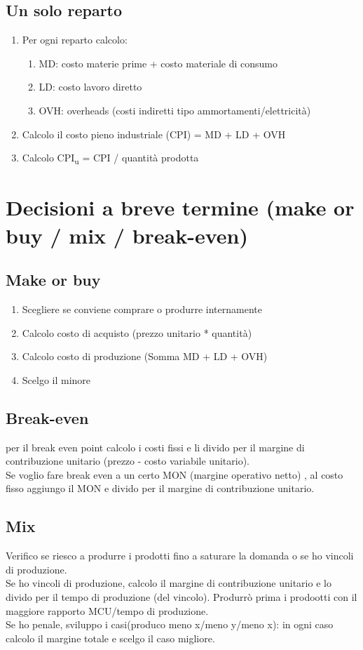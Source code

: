 \documentclass{scrreprt}
\begin{document}
\subsection*{Un solo reparto}
\begin{enumerate}
	\item Per ogni reparto calcolo: \begin{enumerate}
		\item MD: costo materie prime + costo materiale di consumo
		\item LD: costo lavoro diretto
		\item OVH: overheads (costi indiretti tipo ammortamenti/elettricità)
	\end{enumerate}
	\item Calcolo il costo pieno industriale (CPI) = MD + LD + OVH
	\item Calcolo CPI\textsubscript{u} = CPI / quantità prodotta
\end{enumerate}

\section*{Decisioni a breve termine (make or buy / mix / break-even)}
\subsection*{Make or buy}
\begin{enumerate}
	\item Scegliere se conviene comprare o produrre internamente
	\item Calcolo costo di acquisto (prezzo unitario * quantità)
	\item Calcolo costo di produzione (Somma MD + LD + OVH)
	\item Scelgo il minore
\end{enumerate}

\subsection*{Break-even}
per il break even point calcolo i costi fissi e li divido per il margine di contribuzione unitario (prezzo - costo variabile unitario).\\
Se voglio fare break even a un certo MON (margine operativo netto) , al costo fisso aggiungo il MON e divido per il margine di contribuzione unitario.

\subsection*{Mix}
Verifico se riesco a produrre i prodotti fino a saturare la domanda o se ho vincoli di produzione.\\
Se ho vincoli di produzione, calcolo il margine di contribuzione unitario e lo divido per il tempo di produzione (del vincolo). Produrrò prima i prodootti con il maggiore rapporto MCU/tempo di produzione.\\
Se ho penale, sviluppo i casi(produco meno x/meno y/meno x): in ogni caso calcolo il margine totale e scelgo il caso migliore.
\end{document}
